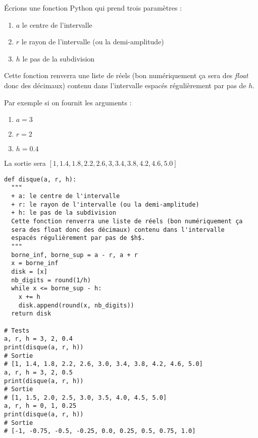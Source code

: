 \documentclass[a4paper, 11pt, twoside]{article}
\begin{document}
Écrions une fonction Python qui prend trois paramètres :
\begin{enumerate}
\item \(a\) le centre de l'intervalle
\item \(r\) le rayon de l'intervalle (ou la demi-amplitude)
\item \(h\) le pas de la subdivision
\end{enumerate}

Cette fonction renverra une liste de réels (bon numériquement ça
sera des \emph{float} donc des décimaux) contenu dans l'intervalle
espacés régulièrement par pas de \(h\).

Par exemple si on fournit les arguments :
\begin{enumerate}
\item \(a = 3\)
\item \(r = 2\)
\item \(h = 0.4\)
\end{enumerate}

La sortie sera \([1, 1.4, 1.8, 2.2, 2.6, 3, 3.4, 3.8, 4.2, 4.6,
    5.0]\)

\begin{verbatim}
def disque(a, r, h):
  """
  + a: le centre de l'intervalle
  + r: le rayon de l'intervalle (ou la demi-amplitude)
  + h: le pas de la subdivision
  Cette fonction renverra une liste de réels (bon numériquement ça
  sera des float donc des décimaux) contenu dans l'intervalle
  espacés régulièrement par pas de $h$.
  """
  borne_inf, borne_sup = a - r, a + r
  x = borne_inf
  disk = [x]
  nb_digits = round(1/h)
  while x <= borne_sup - h:
    x += h
    disk.append(round(x, nb_digits))
  return disk

# Tests
a, r, h = 3, 2, 0.4
print(disque(a, r, h))
# Sortie
# [1, 1.4, 1.8, 2.2, 2.6, 3.0, 3.4, 3.8, 4.2, 4.6, 5.0]
a, r, h = 3, 2, 0.5
print(disque(a, r, h))
# Sortie
# [1, 1.5, 2.0, 2.5, 3.0, 3.5, 4.0, 4.5, 5.0]
a, r, h = 0, 1, 0.25
print(disque(a, r, h))
# Sortie 
# [-1, -0.75, -0.5, -0.25, 0.0, 0.25, 0.5, 0.75, 1.0]
\end{verbatim}
\end{document}
